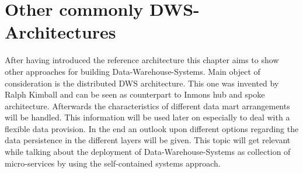 \section{Other commonly DWS-Architectures}
\label{sec:otherArchitectures}
After having introduced the reference architecture this chapter aims to show other approaches for building Data-Warehouse-Systems. Main object of consideration is the distributed DWS architecture. This one was invented by Ralph Kimball and can be seen as counterpart to Inmons hub and spoke architecture.\newline
Afterwards the characteristics of different data mart arrangements will be handled. This information will be used later on especially to deal with a flexible data provision.\newline
In the end an outlook upon different options regarding the data persistence in the different layers will be given. This topic will get relevant while talking about the deployment of Data-Warehouse-Systems as collection of micro-services by using the self-contained systems approach.


